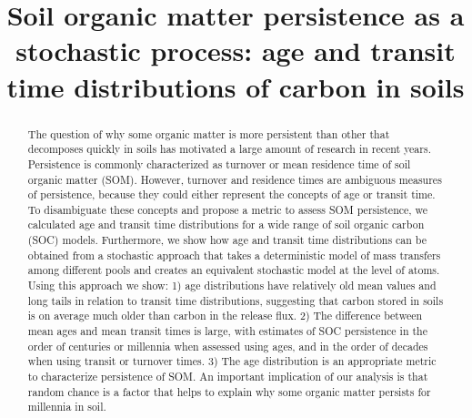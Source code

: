 \documentclass[draft,linenumbers]{agujournal}
\begin{document}
\title{Soil organic matter persistence as a stochastic process: age and transit time distributions of carbon in soils}









\begin{abstract}
The question of why some organic matter is more persistent than other that decomposes quickly in soils has motivated a large amount of research in recent years. Persistence is commonly characterized as turnover or mean residence time of soil organic matter (SOM). However, turnover and residence times are ambiguous measures of persistence,
because they could either represent the concepts of age or transit time.
To disambiguate these concepts and propose a metric to assess SOM persistence, we calculated age and transit time distributions for a wide range of soil organic carbon (SOC) models.
Furthermore, we show how age and transit time distributions can be obtained from a stochastic approach that takes a deterministic model of mass transfers among different pools and creates an equivalent stochastic model at the level of atoms.
Using this approach we show: 1) age distributions have relatively old mean values and long tails in relation to transit time distributions, suggesting that carbon stored in soils is on average much older than carbon in the release flux. 2) The difference between mean ages and mean transit times is large, with estimates of SOC persistence in the order of centuries or millennia when assessed using ages, and in the order of decades when using transit or turnover times. 3) The age distribution is an appropriate metric to characterize persistence of SOM.  An important implication of our analysis is that random chance is a factor that helps to explain why some organic matter persists for millennia in soil.  
\end{abstract}
\end{document}

